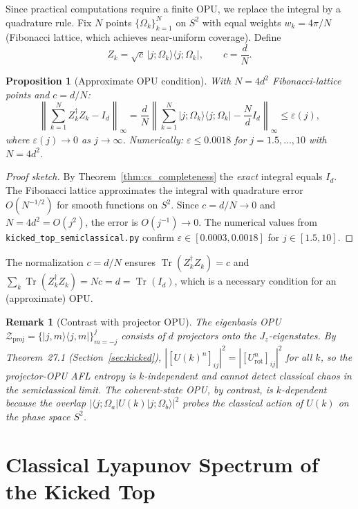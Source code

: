 \documentclass[12pt,a4paper]{article}
\newtheorem{proposition}[theorem]{Proposition}
\newtheorem{remark}[theorem]{Remark}
\DeclareMathOperator{\Tr}{Tr}
\begin{document}
Since practical computations require a finite OPU, we replace the integral
by a quadrature rule.  Fix $N$ points $\{\Omega_k\}_{k=1}^N$ on $S^2$
with equal weights $w_k = 4\pi/N$ (Fibonacci lattice, which achieves
near-uniform coverage).  Define
\[
  Z_k = \sqrt{c}\,|j;\Omega_k\rangle\langle j;\Omega_k|,
  \qquad
  c = \frac{d}{N}.
\]

\begin{proposition}[Approximate OPU condition]
  \label{prop:cs_approx_opu}
  With $N = 4d^2$ Fibonacci-lattice points and $c = d/N$:
  \[
    \left\|\sum_{k=1}^N Z_k^\dagger Z_k - I_d\right\|_\infty
    = \frac{d}{N}\left\|\sum_{k=1}^N |j;\Omega_k\rangle\langle j;\Omega_k| - \frac{N}{d}I_d\right\|_\infty
    \leq \varepsilon(j),
  \]
  where $\varepsilon(j) \to 0$ as $j\to\infty$.  Numerically:
  $\varepsilon \leq 0.0018$ for $j=1.5,\ldots,10$ with $N = 4d^2$.
\end{proposition}
\begin{proof}[Proof sketch]
  By Theorem~\ref{thm:cs_completeness} the \emph{exact} integral equals $I_d$.
  The Fibonacci lattice approximates the integral with quadrature error
  $O(N^{-1/2})$ for smooth functions on $S^2$.  Since $c = d/N \to 0$ and
  $N = 4d^2 = O(j^2)$, the error is $O(j^{-1}) \to 0$.
  The numerical values from \texttt{kicked\_top\_semiclassical.py}
  confirm $\varepsilon \in [0.0003,0.0018]$ for $j \in [1.5,10]$.
\end{proof}

The normalization $c = d/N$ ensures $\Tr(Z_k^\dagger Z_k) = c$ and
$\sum_k \Tr(Z_k^\dagger Z_k) = Nc = d = \Tr(I_d)$, which is a necessary
condition for an (approximate) OPU.

\begin{remark}[Contrast with projector OPU]
  The eigenbasis OPU $\mathcal{Z}_{\mathrm{proj}} = \{|j,m\rangle\langle j,m|\}_{m=-j}^j$
  consists of $d$ projectors onto the $J_z$-eigenstates.
  By Theorem~27.1 (Section~\ref{sec:kicked}), $|[U(k)^n]_{ij}|^2 = |[U_{\mathrm{rot}}^n]_{ij}|^2$
  for all $k$, so the projector-OPU AFL entropy is $k$-\emph{independent}
  and cannot detect classical chaos in the semiclassical limit.
  The coherent-state OPU, by contrast, is $k$-\emph{dependent} because
  the overlap $|\langle j;\Omega_a|U(k)|j;\Omega_b\rangle|^2$ probes the
  classical action of $U(k)$ on the phase space $S^2$.
\end{remark}

\section{Classical Lyapunov Spectrum of the Kicked Top}
\label{sec:classical_lyapunov}
\end{document}
